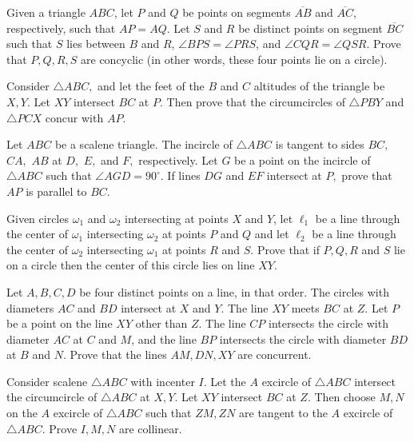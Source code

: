 \documentclass{article}
\begin{document}
\begin{req}[USAJMO 2012/1]{3}
Given a triangle $ABC$, let $P$ and $Q$ be points on segments $\overline{AB}$ and $\overline{AC}$, respectively, such that $AP=AQ$. Let $S$ and $R$ be distinct points on segment $\overline{BC}$ such that $S$ lies between $B$ and $R$, $\angle BPS=\angle PRS$, and $\angle CQR=\angle QSR$. Prove that $P,Q,R,S$ are concyclic (in other words, these four points lie on a circle).
\end{req}

\begin{prob}{3}
Consider $\triangle ABC,$ and let the feet of the $B$ and $C$ altitudes of the triangle be $X,Y.$ Let $XY$ intersect $BC$ at $P.$ Then prove that the circumcircles of $\triangle PBY$ and $\triangle PCX$ concur with $AP.$
\end{prob} 

\begin{prob}[GOTEEM 1]{4}
Let $ABC$ be a scalene triangle. The incircle of $\triangle ABC$ is tangent to sides $BC,$ $CA,$ $AB$ at $D,$ $E,$ and $F,$ respectively. Let $G$ be a point on the incircle of $\triangle ABC$ such that $\angle AGD = 90^{\circ}.$ If lines $DG$ and $EF$ intersect at $P,$ prove that $AP$ is parallel to $BC.$
\end{prob}

\begin{prob}[USAMO 2009/1]{4}
Given circles $\omega_1$ and $\omega_2$ intersecting at points $X$ and $Y$, let $\ell_1$ be a line through the center of $\omega_1$ intersecting $\omega_2$ at points $P$ and $Q$ and let $\ell_2$ be a line through the center of $\omega_2$ intersecting $\omega_1$ at points $R$ and $S$. Prove that if $P, Q, R$ and $S$ lie on a circle then the center of this circle lies on line $XY$.
\end{prob}

\begin{prob}[IMO 1995/1]{4}
Let $A,B,C,D$ be four distinct points on a line, in that order. The circles with diameters $AC$ and $BD$ intersect at $X$ and $Y$. The line $XY$ meets $BC$ at $Z$. Let $P$ be a point on the line $XY$ other than $Z$. The line $CP$ intersects the circle with diameter $AC$ at $C$ and $M$, and the line $BP$ intersects the circle with diameter $BD$ at $B$ and $N$. Prove that the lines $AM,DN,XY$ are concurrent.
\end{prob}

\begin{prob}[]{6}
Consider scalene $\triangle ABC$ with incenter $I.$ Let the $A$ excircle of $\triangle ABC$ intersect the circumcircle of $\triangle ABC$ at $X,Y.$ Let $XY$ intersect $BC$ at $Z.$ Then choose $M,N$ on the $A$ excircle of $\triangle ABC$ such that $ZM,ZN$ are tangent to the $A$ excircle of $\triangle ABC.$ Prove $I,M,N$ are collinear.
\end{prob}
\end{document}
